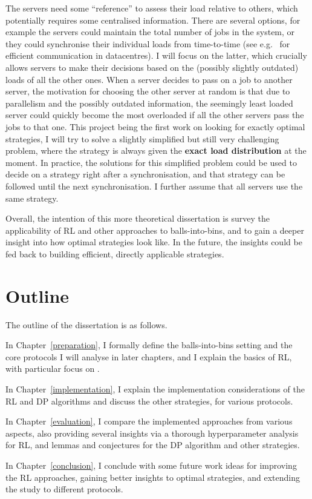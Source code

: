 The servers need some ``reference'' to assess their load relative to others, which potentially requires some centralised information. There are several options, for example the servers could maintain the total number of jobs in the system, or they could synchronise their individual loads from time-to-time (see e.g.~\cite{zhang2018datacenterloadbalancing} for efficient communication in datacentres). I will focus on the latter, which crucially allows servers to make their decisions based on the (possibly slightly outdated) loads of all the other ones. When a server decides to pass on a job to another server, the motivation for choosing the other server at random is that due to parallelism and the possibly outdated information, the seemingly least loaded server could quickly become the most overloaded if all the other servers pass the jobs to that one. This project being the first work on looking for exactly optimal strategies, I will try to solve a slightly simplified but still very challenging problem, where the strategy is always given the \textbf{exact load distribution} at the moment. In practice, the solutions for this simplified problem could be used to decide on a strategy right after a synchronisation, and that strategy can be followed until the next synchronisation. I further assume that all servers use the same strategy.


Overall, the intention of this more theoretical dissertation is survey the applicability of RL and other approaches to balls-into-bins, and to gain a deeper insight into how optimal strategies look like. In the future, the insights could be fed back to building efficient, directly applicable strategies.


\section{Outline}

The outline of the dissertation is as follows.


In Chapter~\ref{preparation}, I formally define the balls-into-bins setting and the core protocols I will analyse in later chapters, and I explain the basics of RL, with particular focus on \DQL.


In Chapter~\ref{implementation}, I explain the implementation considerations of the RL and DP algorithms and discuss the other strategies, for various protocols.


In Chapter~\ref{evaluation}, I compare the implemented approaches from various aspects, also providing several insights via a thorough hyperparameter analysis for RL, and lemmas and conjectures for the DP algorithm and other strategies.

In Chapter~\ref{conclusion}, I conclude with some future work ideas for improving the RL approaches, gaining better insights to optimal strategies, and extending the study to different protocols.